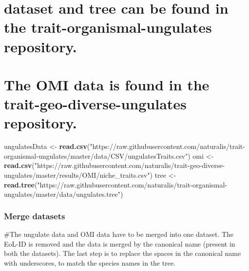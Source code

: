 \documentclass[
]{article}
\newenvironment{Shaded}{\begin{snugshade}}{\end{snugshade}}
\newcommand{\CommentTok}[1]{\textcolor[rgb]{0.56,0.35,0.01}{\textit{#1}}}
\newcommand{\DataTypeTok}[1]{\textcolor[rgb]{0.13,0.29,0.53}{#1}}
\newcommand{\DecValTok}[1]{\textcolor[rgb]{0.00,0.00,0.81}{#1}}
\newcommand{\KeywordTok}[1]{\textcolor[rgb]{0.13,0.29,0.53}{\textbf{#1}}}
\newcommand{\NormalTok}[1]{#1}
\newcommand{\OperatorTok}[1]{\textcolor[rgb]{0.81,0.36,0.00}{\textbf{#1}}}
\newcommand{\StringTok}[1]{\textcolor[rgb]{0.31,0.60,0.02}{#1}}
\begin{document}
\hypertarget{dataset-and-tree-can-be-found-in-the-trait-organismal-ungulates-repository.}{%
\section{dataset and tree can be found in the trait-organismal-ungulates
repository.}\label{dataset-and-tree-can-be-found-in-the-trait-organismal-ungulates-repository.}}

\hypertarget{the-omi-data-is-found-in-the-trait-geo-diverse-ungulates-repository.}{%
\section{The OMI data is found in the trait-geo-diverse-ungulates
repository.}\label{the-omi-data-is-found-in-the-trait-geo-diverse-ungulates-repository.}}

\begin{Shaded}
\begin{Highlighting}[]
\NormalTok{ungulatesData <-}\StringTok{ }\KeywordTok{read.csv}\NormalTok{(}\StringTok{"https://raw.githubusercontent.com/naturalis/trait-organismal-ungulates/master/data/CSV/ungulatesTraits.csv"}\NormalTok{)}
\NormalTok{omi <-}\StringTok{ }\KeywordTok{read.csv}\NormalTok{(}\StringTok{"https://raw.githubusercontent.com/naturalis/trait-geo-diverse-ungulates/master/results/OMI/niche_traits.csv"}\NormalTok{)}
\NormalTok{tree <-}\StringTok{ }\KeywordTok{read.tree}\NormalTok{(}\StringTok{"https://raw.githubusercontent.com/naturalis/trait-organismal-ungulates/master/data/ungulates.tree"}\NormalTok{)}
\end{Highlighting}
\end{Shaded}

\hypertarget{merge-datasets}{%
\subsubsection{Merge datasets}\label{merge-datasets}}

\#The ungulate data and OMI data have to be merged into one dataset. The
EoL-ID is removed and the data is merged by the canonical name (present
in both the datasets). The last step is to replace the spaces in the
canonical name with underscores, to match the species names in the tree.

\begin{Shaded}
\end{Shaded}
\end{document}
